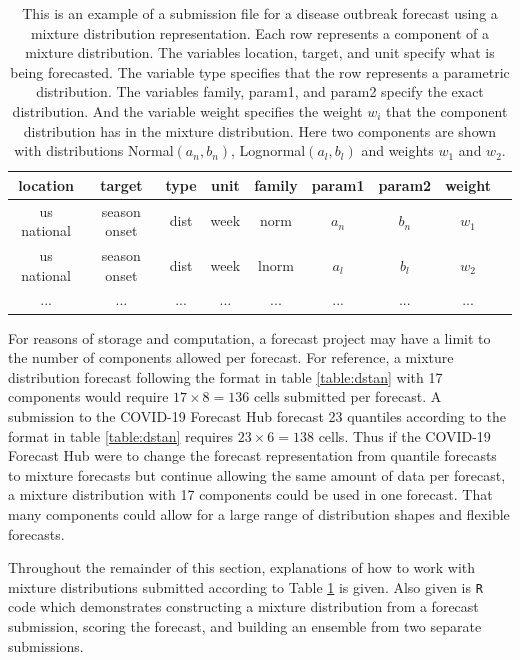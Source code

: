 \documentclass[11pt,notitlepage]{isuthesis}
\begin{document}
\begin{table}[h!]
\centering
 \begin{tabular}{|c|c|c|c|c|c|c|c|c|}
 \hline
    location & target & type & unit & family & param1 & param2 & weight
    \\ \hline
    us national & season onset & dist & week & norm & $a_n$ & $b_n$ & $w_1$\\
    us national & season onset & dist & week & lnorm & $a_l$ & $b_l$ & $w_2$\\
    ... & ... & ... & ... & ... & ... & ... & ...\\
 \hline
 \end{tabular}
 \begin{minipage}{11cm}
\captionsetup{font=scriptsize}
 \caption[Mixture distribution forecast submission example]{This is an example 
 of a 
 submission file
 for a disease outbreak forecast using a mixture distribution representation.
 Each row represents a component of a mixture distribution. The variables
 location, target, and unit specify what is being forecasted. The variable type
 specifies that the row represents a parametric distribution. The variables
 family, param1, and param2 specify the exact distribution. And the variable 
 weight specifies the weight $w_i$ that the component distribution has in the
 mixture distribution. Here two components are shown with distributions
 Normal$(a_n, b_n)$, Lognormal$(a_l, b_l)$ and weights $w_1$ and $w_2$.}
 \label{table:mstan}
 \end{minipage}
\end{table}

For reasons of storage and computation, a forecast project may have a limit to 
the number of components allowed per forecast.
For reference, a mixture distribution forecast following the 
format in table \ref{table:dstan} with 17
components would require $17 \times 8 = 136$ cells submitted per forecast. 
A submission to the COVID-19 Forecast Hub forecast 23 quantiles
according to the format in table \ref{table:dstan} requires
$23 \times 6 = 138$ cells. Thus if the COVID-19 Forecast Hub were to change the
forecast representation from quantile forecasts to mixture forecasts but 
continue allowing the same amount of data per forecast, 
a mixture distribution with 17 components could be used in one forecast. That
many components could allow for a large range of distribution shapes and 
flexible forecasts.

Throughout the remainder of this section, explanations of how to work with 
mixture distributions submitted according to Table \ref{table:mstan} is 
given. Also given is
\texttt{R} code which 
demonstrates constructing a mixture distribution from a forecast submission, 
scoring the forecast, and building an ensemble from two separate submissions.
\end{document}
